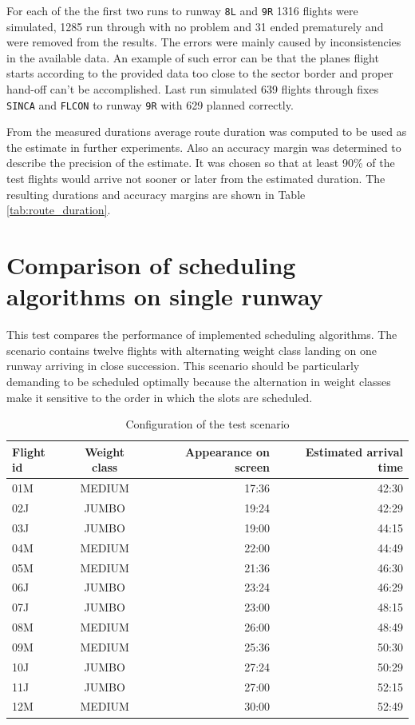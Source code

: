 For each of the the first two runs to runway \texttt{8L} and \texttt{9R} 1316 flights were simulated, 1285 run through with no problem and 31 ended prematurely and were removed from the results. The errors were mainly caused by inconsistencies in the available data. An example of such error can be that the planes flight starts according to the provided data too close to the sector border and proper hand-off can't be accomplished. Last run simulated 639 flights through fixes \texttt{SINCA} and \texttt{FLCON} to runway \texttt{9R} with 629 planned correctly.

From the measured durations average route duration was computed to be used as the estimate in further experiments. Also an accuracy margin was determined to describe the precision of the estimate. It was chosen so that at least 90\% of the test flights would arrive not sooner or later from the estimated duration. The resulting durations and accuracy margins are shown in Table \ref{tab:route_duration}.

\section{Comparison of scheduling algorithms on single runway}
\label{section:1rwy-alternating}

This test compares the performance of implemented scheduling algorithms. The scenario contains twelve flights with alternating weight class landing on one runway arriving in close succession. This scenario should be particularly demanding to be scheduled optimally because the alternation in weight classes make it sensitive to the order in which the slots are scheduled.

\begin{table}[h]
  \centering
\begin{tabular}{ | l | c | r | r | }
\hline
Flight id	& Weight class	& Appearance on screen & Estimated arrival time	\\
\hline
01M	& MEDIUM	& 17:36	& 42:30	\\
02J	& JUMBO		& 19:24	& 42:29	\\
03J	& JUMBO		& 19:00	& 44:15	\\
04M	& MEDIUM	& 22:00	& 44:49	\\
05M	& MEDIUM	& 21:36	& 46:30	\\
06J	& JUMBO		& 23:24	& 46:29	\\
07J	& JUMBO		& 23:00	& 48:15	\\
08M	& MEDIUM	& 26:00	& 48:49	\\
09M	& MEDIUM	& 25:36	& 50:30	\\
10J	& JUMBO		& 27:24	& 50:29	\\
11J	& JUMBO		& 27:00	& 52:15	\\
12M	& MEDIUM	& 30:00	& 52:49	\\
\hline
\end{tabular}
  \caption{Configuration of the test scenario}
  \label{tab:config1}
\end{table}


